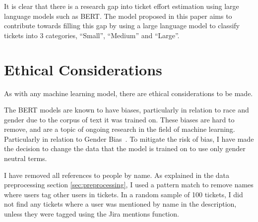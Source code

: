 \documentclass{UoYCSproject}
\begin{document}
    It is clear that there is a research gap into ticket effort estimation using large language models such as BERT.
    The model proposed in this paper aims to contribute towards filling this gap by using a large language model to classify tickets into 3 categories, “Small”, “Medium” and “Large”.

    \chapter{Ethical Considerations}\label{cha:ethical considerations}
    As with any machine learning model, there are ethical considerations to be made.

    The BERT models are known to have biases, particularly in relation to race and gender due to the corpus of text it was trained on.
    These biases are hard to remove, and are a topic of ongoing research in the field of machine learning. Particularly in relation to Gender Bias~\cite{Jentzsch_2022, li2021detecting}.
    To mitigate the risk of bias, I have made the decision to change the data that the model is trained on to use only gender neutral terms.

    I have removed all references to people by name. As explained in the data preprocessing section \ref{sec:preprocessing}, I used a pattern match to remove names where users tag other users in tickets.
    In a random sample of 100 tickets, I did not find any tickets where a user was mentioned by name in the description, unless they were tagged using the Jira mentions function.
\end{document}
